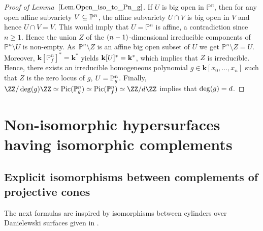 \documentclass[JEP,XML,SOM,Unicode,NoFloatCountersInSection,published]{cedram}
\theoremstyle{definition}
\renewcommand\k{{\mathbf k}}
\newcommand\p{{\mathbb P}}\let\PP\p
\newcommand{\kk}{\mathbf{k}}
\DeclareMathOperator{\Pic}{Pic}
\begin{document}
\begin{proof}[Proof of Lemma~$\ref{Lem.Open_iso_to_Pn_g}$]
If $U$ is big open in $\PP^n$, then for any open affine subvariety $V \subseteq\nobreak \PP^n$,
the affine subvariety $U \cap V$ is big open in $V$ and hence $U \cap V = V$. This would imply that $U = \PP^n$
is affine, a contradiction since $n \geq 1$. Hence the union $Z$ of the $(n-\nobreak1)$-dimensional
irreducible components of $\PP^n \setminus U$ is non-empty. As~$\PP^n \setminus Z$ is an affine
big open subset of $U$ we get $\PP^n \setminus Z = U$.
Moreover, $\kk[\p^n_f]^\ast= \k^\ast$ yields $\kk[U]^\ast=\nobreak\k^\ast$, which implies that $Z$ is irreducible.
Hence, there exists an irreducible homogeneous polynomial $g \in \kk[x_0, \ldots, x_n]$ such that $Z$
is the zero locus of $g$, \ie $U =\nobreak \PP^n_g$. Finally, $\ZZ / \deg(g) \ZZ \simeq \Pic(\p^n_g) \simeq \Pic(\p^n_f) \simeq \ZZ / d \ZZ$ implies that $\deg(g) =\nobreak d$.
\end{proof}

\section{Non-isomorphic hypersurfaces having isomorphic complements}
\subsection{Explicit isomorphisms between complements of projective cones}

The next formulas are
inspired by isomorphisms between cylinders over Danielewski surfaces given in \cite{MoPo2021Isomorphisms-betwe}.
\end{document}
